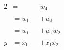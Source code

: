 \begin{minipage}[c]{0.5\textwidth}
    \begin{alignat*}{2}
        & =        &  & w_4 \\
        \\
        & = w_1    &  & + w_3       \\
        \\
        & = w_1 &  & + w_1 w_2 \\
        \\
        y & = x_1 &  & + x_1 x_2 \\
    \end{alignat*}
\end{minipage}%
\begin{minipage}[c]{0.5\textwidth}



\end{minipage}

